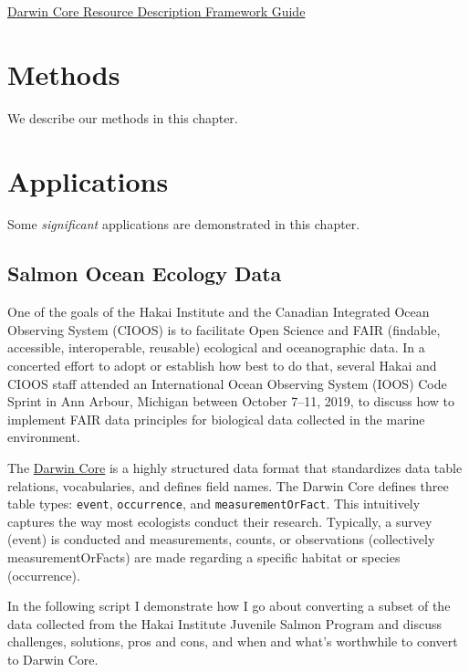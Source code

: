 \documentclass[]{book}
\begin{document}
\href{\%22https://dwc.tdwg.org/rdf/\%22}{Darwin Core Resource Description Framework Guide}

\hypertarget{methods}{%
\chapter{Methods}\label{methods}}

We describe our methods in this chapter.

\hypertarget{applications}{%
\chapter{Applications}\label{applications}}

Some \emph{significant} applications are demonstrated in this chapter.

\hypertarget{salmon-ocean-ecology-data}{%
\section{Salmon Ocean Ecology Data}\label{salmon-ocean-ecology-data}}

One of the goals of the Hakai Institute and the Canadian Integrated Ocean Observing System (CIOOS) is to facilitate Open Science and FAIR (findable, accessible, interoperable, reusable) ecological and oceanographic data. In a concerted effort to adopt or establish how best to do that, several Hakai and CIOOS staff attended an International Ocean Observing System (IOOS) Code Sprint in Ann Arbour, Michigan between October 7--11, 2019, to discuss how to implement FAIR data principles for biological data collected in the marine environment.

The \href{https://dwc.tdwg.org}{Darwin Core} is a highly structured data format that standardizes data table relations, vocabularies, and defines field names. The Darwin Core defines three table types: \texttt{event}, \texttt{occurrence}, and \texttt{measurementOrFact}. This intuitively captures the way most ecologists conduct their research. Typically, a survey (event) is conducted and measurements, counts, or observations (collectively measurementOrFacts) are made regarding a specific habitat or species (occurrence).

In the following script I demonstrate how I go about converting a subset of the data collected from the Hakai Institute Juvenile Salmon Program and discuss challenges, solutions, pros and cons, and when and what's worthwhile to convert to Darwin Core.
\end{document}
